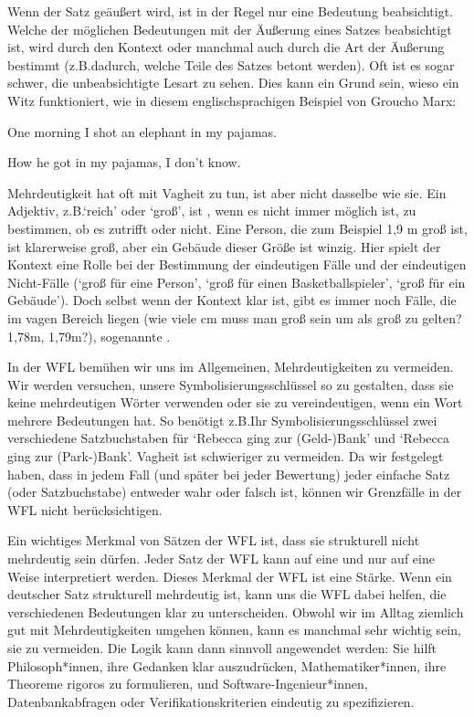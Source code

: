 Wenn der Satz geäu{\ss}ert wird, ist in der Regel nur eine Bedeutung beabsichtigt. Welche der möglichen Bedeutungen mit der Äu{\ss}erung eines Satzes beabsichtigt ist, wird durch den Kontext oder manchmal auch durch die Art der Äu{\ss}erung bestimmt (z.B.\@ dadurch, welche Teile des Satzes betont werden). Oft ist es sogar schwer, die unbeabsichtigte Lesart zu sehen. Dies kann ein Grund sein, wieso ein Witz funktioniert, wie in diesem englischsprachigen Beispiel von Groucho Marx:
\begin{earg}
	\item[] One morning I shot an elephant in my pajamas.
	\item[] How he got in my pajamas, I don't know.
\end{earg}

Mehrdeutigkeit hat oft mit Vagheit zu tun, ist aber nicht dasselbe wie sie. Ein Adjektiv, z.B.\@ `reich' oder `gro{\ss}', ist , wenn es nicht immer möglich ist, zu bestimmen, ob es zutrifft oder nicht. Eine Person, die zum Beispiel 1,9 m gro{\ss} ist, ist klarerweise gro{\ss}, aber ein Gebäude dieser Grö{\ss}e ist winzig.  Hier spielt der Kontext eine Rolle bei der Bestimmung der eindeutigen Fälle und der eindeutigen Nicht-Fälle (`gro{\ss} für eine Person', `gro{\ss} für einen Basketballspieler', `gro{\ss} für ein Gebäude'). Doch selbst wenn der Kontext klar ist, gibt es immer noch Fälle, die im vagen Bereich liegen (wie viele cm muss man gro{\ss} sein um als gro{\ss} zu gelten? 1,78m, 1,79m?), sogenannte .

In der WFL bemühen wir uns im Allgemeinen, Mehrdeutigkeiten zu vermeiden. Wir werden versuchen, unsere Symbolisierungsschlüssel so zu gestalten, dass sie keine mehrdeutigen Wörter verwenden oder sie zu vereindeutigen, wenn ein Wort mehrere Bedeutungen hat. So benötigt z.B.\@ Ihr Symbolisierungsschlüssel zwei verschiedene Satzbuchstaben für `Rebecca ging zur (Geld-)Bank' und `Rebecca ging zur (Park-)Bank'. Vagheit ist schwieriger zu vermeiden. Da wir festgelegt haben, dass in jedem Fall (und später bei jeder Bewertung) jeder einfache Satz (oder Satzbuchstabe) entweder wahr oder falsch ist, können wir Grenzfälle in der WFL nicht berücksichtigen.

Ein wichtiges Merkmal von Sätzen der WFL ist, dass sie strukturell nicht mehrdeutig sein dürfen. Jeder Satz der WFL kann auf eine und nur auf eine Weise interpretiert werden. Dieses Merkmal der WFL ist eine Stärke. Wenn ein deutscher Satz strukturell mehrdeutig ist, kann uns die WFL dabei helfen, die verschiedenen Bedeutungen klar zu unterscheiden. Obwohl wir im Alltag ziemlich gut mit Mehrdeutigkeiten umgehen können, kann es manchmal sehr wichtig sein, sie zu vermeiden. Die Logik kann dann sinnvoll angewendet werden: Sie hilft Philosoph*innen, ihre Gedanken klar auszudrücken, Mathematiker*innen, ihre Theoreme rigoros zu formulieren, und Software-Ingenieur*innen, Datenbankabfragen oder Verifikationskriterien eindeutig zu spezifizieren. 

